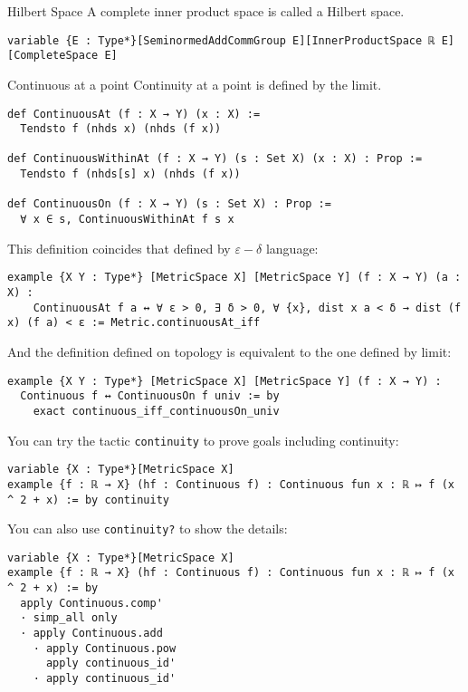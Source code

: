 \documentclass[a4paper]{article}
\begin{document}
\begin{dfn}{Hilbert Space}
A complete inner product space is called a Hilbert space.
\begin{lstlisting}[style = lean]
variable {E : Type*}[SeminormedAddCommGroup E][InnerProductSpace ℝ E][CompleteSpace E]
\end{lstlisting}
\end{dfn}

\begin{dfn}{Continuous at a point}
Continuity at a point is defined by the limit.
\begin{lstlisting}[style = lean]
def ContinuousAt (f : X → Y) (x : X) :=
  Tendsto f (nhds x) (nhds (f x))
  
def ContinuousWithinAt (f : X → Y) (s : Set X) (x : X) : Prop :=
  Tendsto f (nhds[s] x) (nhds (f x))
  
def ContinuousOn (f : X → Y) (s : Set X) : Prop :=
  ∀ x ∈ s, ContinuousWithinAt f s x
\end{lstlisting}
\end{dfn}

This definition coincides that defined by $\varepsilon-\delta$ language:
\begin{xmp}{}
\begin{lstlisting}[style=lean]
example {X Y : Type*} [MetricSpace X] [MetricSpace Y] (f : X → Y) (a : X) :
    ContinuousAt f a ↔ ∀ ε > 0, ∃ δ > 0, ∀ {x}, dist x a < δ → dist (f x) (f a) < ε := Metric.continuousAt_iff
\end{lstlisting}   
\end{xmp}

And the definition defined on topology is equivalent to the one defined by limit:
\begin{xmp}{}
\begin{lstlisting}[style = lean]
example {X Y : Type*} [MetricSpace X] [MetricSpace Y] (f : X → Y) :
  Continuous f ↔ ContinuousOn f univ := by
    exact continuous_iff_continuousOn_univ
\end{lstlisting} 
\end{xmp}
You can try the tactic \texttt{continuity} to prove goals including continuity:
\begin{xmp}{}
\begin{lstlisting}[style = lean]
variable {X : Type*}[MetricSpace X]
example {f : ℝ → X} (hf : Continuous f) : Continuous fun x : ℝ ↦ f (x ^ 2 + x) := by continuity
\end{lstlisting}
\end{xmp}
You can also use \texttt{continuity?} to show the details:
\begin{xmp}{}
\begin{lstlisting}[style = lean]
variable {X : Type*}[MetricSpace X]
example {f : ℝ → X} (hf : Continuous f) : Continuous fun x : ℝ ↦ f (x ^ 2 + x) := by
  apply Continuous.comp'
  · simp_all only
  · apply Continuous.add
    · apply Continuous.pow
      apply continuous_id'
    · apply continuous_id'
\end{lstlisting}
\end{xmp}
\end{document}
